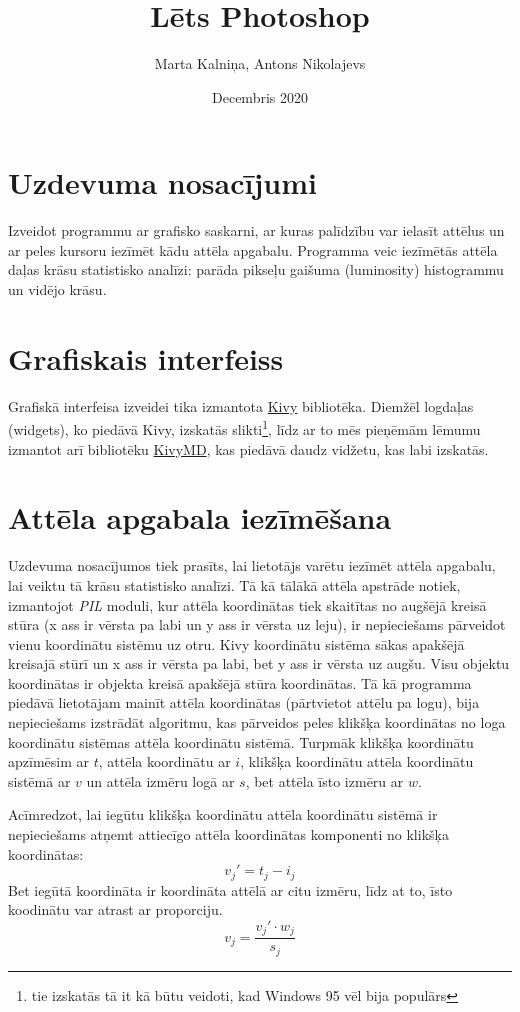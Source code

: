 \documentclass{article}
\title{Lēts Photoshop}
\author{Marta Kalniņa, Antons Nikolajevs }
\date{Decembris 2020}
\begin{document}
\maketitle

\section{Uzdevuma nosacījumi}
Izveidot programmu ar grafisko saskarni, ar kuras palīdzību var ielasīt attēlus un ar peles kursoru iezīmēt kādu attēla apgabalu. Programma veic iezīmētās attēla daļas krāsu statistisko analīzi: parāda pikseļu gaišuma (luminosity) histogrammu un vidējo krāsu.
\section{Grafiskais interfeiss}
Grafiskā interfeisa izveidei tika izmantota \href{https://kivy.org/#home}{Kivy} bibliotēka. Diemžēl logdaļas (widgets), ko piedāvā Kivy, izskatās slikti\footnote{tie izskatās tā it kā būtu veidoti, kad Windows 95 vēl bija populārs}, līdz ar to mēs pieņēmām lēmumu izmantot arī bibliotēku \href{https://github.com/kivymd/KivyMD}{KivyMD}, kas piedāvā daudz vidžetu, kas labi izskatās.

\section{Attēla apgabala iezīmēšana}
Uzdevuma nosacījumos tiek prasīts, lai lietotājs varētu iezīmēt attēla apgabalu, lai veiktu tā krāsu statistisko analīzi.
Tā kā tālākā attēla apstrāde notiek, izmantojot \textit{PIL} moduli, kur attēla koordinātas tiek skaitītas no augšējā kreisā stūra (x ass ir vērsta pa labi un y ass ir vērsta uz leju), ir nepieciešams pārveidot vienu koordinātu sistēmu uz otru. Kivy koordinātu sistēma sākas apakšējā kreisajā stūrī un x ass ir vērsta pa labi, bet y ass ir vērsta uz augšu. Visu objektu koordinātas ir objekta kreisā apakšējā stūra koordinātas. Tā kā programma piedāvā lietotājam mainīt attēla koordinātas (pārtvietot attēlu pa logu), bija nepieciešams izstrādāt algoritmu, kas pārveidos peles klikšķa koordinātas no loga koordinātu sistēmas attēla koordinātu sistēmā. Turpmāk klikšķa koordinātu apzīmēsim ar $t$, attēla koordinātu ar $i$, klikšķa koordinātu attēla koordinātu sistēmā ar $v$ un attēla izmēru logā ar $s$, bet attēla īsto izmēru ar $w$.

Acīmredzot, lai iegūtu klikšķa koordinātu attēla koordinātu sistēmā ir nepieciešams atņemt attiecīgo attēla koordinātas komponenti no klikšķa koordinātas:
$$
    v_j\prime = t_j - i_j
$$
Bet iegūtā koordināta ir koordināta attēlā ar citu izmēru, līdz at to, īsto koodinātu var atrast ar proporciju.
$$
    v_j = \frac{v_j\prime \cdot w_j}{s_j}
$$
\end{document}
